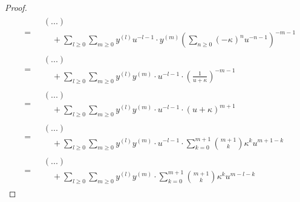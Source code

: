\begin{proof}
$$\begin{aligned}
                                & =
                                \begin{aligned}
                                    & (...)
                                    \\
                                    & \quad + \sum_{l \geq 0} \sum_{m \geq 0} y^{(l)} u^{-l - 1} \cdot y^{(m)} \left( \sum_{n \geq 0} (-\kappa)^n u^{-n - 1} \right)^{-m - 1}
                                \end{aligned}
                                \\
                                & =
                                \begin{aligned}
                                    & (...)
                                    \\
                                    & \quad + \sum_{l \geq 0} \sum_{m \geq 0} y^{(l)} y^{(m)} \cdot u^{-l - 1} \cdot \left( \frac{1}{u + \kappa} \right)^{-m - 1}
                                \end{aligned}
                                \\
                                & =
                                \begin{aligned}
                                    & (...)
                                    \\
                                    & \quad + \sum_{l \geq 0} \sum_{m \geq 0} y^{(l)} y^{(m)} \cdot u^{-l - 1} \cdot (u + \kappa)^{m + 1}
                                \end{aligned}
                                \\
                                & = 
                                \begin{aligned}
                                    & (...)
                                    \\
                                    & \quad + \sum_{l \geq 0} \sum_{m \geq 0} y^{(l)} y^{(m)} \cdot u^{-l - 1} \cdot \sum_{k = 0}^{m + 1} \binom{m + 1}{k} \kappa^k u^{m + 1 - k}
                                \end{aligned}
                                \\
                                & =
                                \begin{aligned}
                                    & (...)
                                    \\
                                    & \quad + \sum_{l \geq 0} \sum_{m \geq 0} y^{(l)} y^{(m)} \cdot \sum_{k = 0}^{m + 1} \binom{m + 1}{k} \kappa^k u^{m - l - k}

\end{aligned}
\end{aligned}$$
\end{proof}
